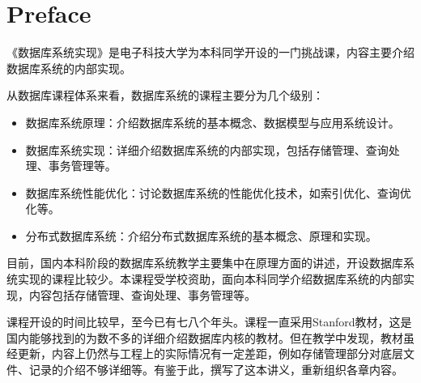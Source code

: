 \chapter{Preface}

《数据库系统实现》是电子科技大学为本科同学开设的一门挑战课，内容主要介绍数据库系统的内部实现。

从数据库课程体系来看，数据库系统的课程主要分为几个级别：

\begin{itemize}
    \item 数据库系统原理：介绍数据库系统的基本概念、数据模型与应用系统设计。
    \item 数据库系统实现：详细介绍数据库系统的内部实现，包括存储管理、查询处理、事务管理等。
    \item 数据库系统性能优化：讨论数据库系统的性能优化技术，如索引优化、查询优化等。
    \item 分布式数据库系统：介绍分布式数据库系统的基本概念、原理和实现。
\end{itemize}

目前，国内本科阶段的数据库系统教学主要集中在原理方面的讲述，开设数据库系统实现的课程比较少。本课程受学校资助，面向本科同学介绍数据库系统的内部实现，内容包括存储管理、查询处理、事务管理等。

课程开设的时间比较早，至今已有七八个年头。课程一直采用Stanford教材\cite{garcia2000database}，这是国内能够找到的为数不多的详细介绍数据库内核的教材。但在教学中发现，教材虽经更新，内容上仍然与工程上的实际情况有一定差距，例如存储管理部分对底层文件、记录的介绍不够详细等。有鉴于此，撰写了这本讲义，重新组织各章内容。

